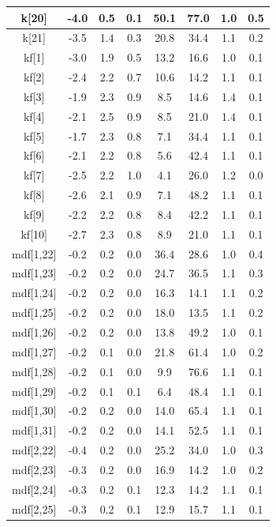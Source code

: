 \begin{longtable}{|c|c|c|c|c|c|c|c|}
\hline
k[20] & -4.0 & 0.5 & 0.1 & 50.1 & 77.0 & 1.0 & 0.5 \\
\hline
k[21] & -3.5 & 1.4 & 0.3 & 20.8 & 34.4 & 1.1 & 0.2 \\
\hline
kf[1] & -3.0 & 1.9 & 0.5 & 13.2 & 16.6 & 1.0 & 0.1 \\
\hline
kf[2] & -2.4 & 2.2 & 0.7 & 10.6 & 14.2 & 1.1 & 0.1 \\
\hline
kf[3] & -1.9 & 2.3 & 0.9 & 8.5 & 14.6 & 1.4 & 0.1 \\
\hline
kf[4] & -2.1 & 2.5 & 0.9 & 8.5 & 21.0 & 1.4 & 0.1 \\
\hline
kf[5] & -1.7 & 2.3 & 0.8 & 7.1 & 34.4 & 1.1 & 0.1 \\
\hline
kf[6] & -2.1 & 2.2 & 0.8 & 5.6 & 42.4 & 1.1 & 0.1 \\
\hline
kf[7] & -2.5 & 2.2 & 1.0 & 4.1 & 26.0 & 1.2 & 0.0 \\
\hline
kf[8] & -2.6 & 2.1 & 0.9 & 7.1 & 48.2 & 1.1 & 0.1 \\
\hline
kf[9] & -2.2 & 2.2 & 0.8 & 8.4 & 42.2 & 1.1 & 0.1 \\
\hline
kf[10] & -2.7 & 2.3 & 0.8 & 8.9 & 21.0 & 1.1 & 0.1 \\
\hline
mdf[1,22] & -0.2 & 0.2 & 0.0 & 36.4 & 28.6 & 1.0 & 0.4 \\
\hline
mdf[1,23] & -0.2 & 0.2 & 0.0 & 24.7 & 36.5 & 1.1 & 0.3 \\
\hline
mdf[1,24] & -0.2 & 0.2 & 0.0 & 16.3 & 14.1 & 1.1 & 0.2 \\
\hline
mdf[1,25] & -0.2 & 0.2 & 0.0 & 18.0 & 13.5 & 1.1 & 0.2 \\
\hline
mdf[1,26] & -0.2 & 0.2 & 0.0 & 13.8 & 49.2 & 1.0 & 0.1 \\
\hline
mdf[1,27] & -0.2 & 0.1 & 0.0 & 21.8 & 61.4 & 1.0 & 0.2 \\
\hline
mdf[1,28] & -0.2 & 0.1 & 0.0 & 9.9 & 76.6 & 1.1 & 0.1 \\
\hline
mdf[1,29] & -0.2 & 0.1 & 0.1 & 6.4 & 48.4 & 1.1 & 0.1 \\
\hline
mdf[1,30] & -0.2 & 0.2 & 0.0 & 14.0 & 65.4 & 1.1 & 0.1 \\
\hline
mdf[1,31] & -0.2 & 0.2 & 0.0 & 14.1 & 52.5 & 1.1 & 0.1 \\
\hline
mdf[2,22] & -0.4 & 0.2 & 0.0 & 25.2 & 34.0 & 1.0 & 0.3 \\
\hline
mdf[2,23] & -0.3 & 0.2 & 0.0 & 16.9 & 14.2 & 1.0 & 0.2 \\
\hline
mdf[2,24] & -0.3 & 0.2 & 0.1 & 12.3 & 14.2 & 1.1 & 0.1 \\
\hline
mdf[2,25] & -0.3 & 0.2 & 0.1 & 12.9 & 15.7 & 1.1 & 0.1 \\

\end{longtable}
